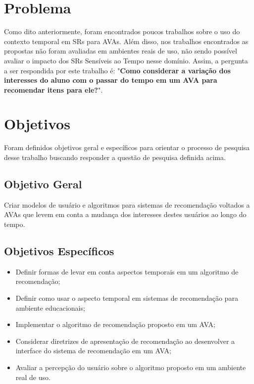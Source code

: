 \section{Problema}

Como dito anteriormente, foram encontrados poucos trabalhos sobre o uso do contexto temporal em SRs para AVAs. Além disso,
nos trabalhos encontrados as propostas não foram avaliadas em ambientes reais de uso, não sendo possível avaliar o
impacto dos SRs Sensíveis ao Tempo nesse domínio. Assim, a pergunta a ser respondida por este trabalho
é: "\textbf{Como considerar a variação dos interesses do aluno com o passar do tempo em um AVA para recomendar itens para ele?}".

\section{Objetivos}

Foram definidos objetivos geral e específicos para orientar o processo de pesquisa desse trabalho buscando responder a questão
de pesquisa definida acima.

\subsection{Objetivo Geral}

Criar modelos de usuário e algoritmos para sistemas de recomendação voltados a AVAs que levem em
conta a mudança dos interesses destes usuários ao longo do tempo.

\subsection{Objetivos Específicos}

\begin{itemize}
\item Definir formas de levar em conta aspectos temporais em um algoritmo de recomendação;
\item Definir como usar o aspecto temporal em sistemas de recomendação para ambiente educacionais;
\item Implementar o algoritmo de recomendação proposto em um AVA;
\item Considerar diretrizes de apresentação de recomendação ao desenvolver a interface do sistema de recomendação
em um AVA;
\item Avaliar a percepção do usuário sobre o algoritmo proposto em um ambiente real de uso.
\end{itemize}

